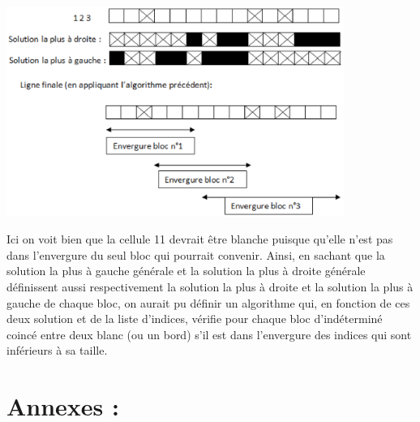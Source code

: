 \documentclass{article}
\begin{document}
\begin{itemize}
\begin{center}
\includegraphics[width=11cm]{image2}
\end{center}
Ici on voit bien que la cellule 11 devrait être blanche puisque qu’elle n’est pas dans l’envergure du seul bloc qui pourrait convenir. Ainsi, en sachant que la solution la plus à gauche générale et la solution la plus à droite générale définissent aussi respectivement la solution la plus à droite et la solution la plus à gauche de chaque bloc, on aurait pu définir un algorithme qui, en fonction de ces deux solution et de la liste d’indices, vérifie pour chaque bloc d’indéterminé coincé entre deux blanc (ou un bord) s’il est dans l’envergure des indices qui sont inférieurs à sa taille.
\end{itemize}
\section{Annexes :}
\end{document}
